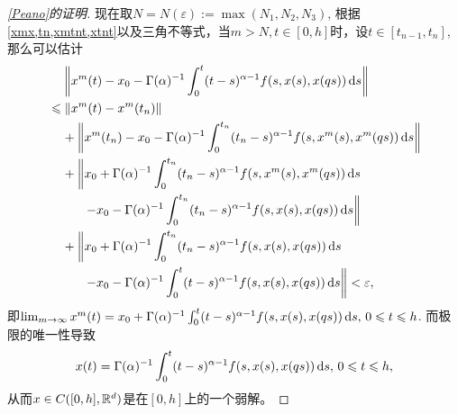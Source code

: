 \begin{proof}[\cref{Peano}的证明]
    现在取$N=N(\varepsilon):=\max (N_1,N_2,N_3)$, 根据\cref{xmx,tn,xmtnt,xtnt}以及三角不等式，当$m>N,t\in [0,h]$时，设$t\in \left[t_{n-1},t_n\right]$, 那么可以估计
    \begin{align*}
        &\relphantom{\leqslant}\left\|x^m(t)-x_0-\Gamma(\alpha)^{-1}\int_{0}^{t}(t-s)^{\alpha-1}f(s,x(s),x(qs))\differential s\right\|
        \\ &\leqslant \left\|x^m(t)-x^m(t_n)\right\|
        \\ &\relphantom{\leqslant}+\left\|x^m(t_n)-x_0-\Gamma(\alpha)^{-1}\int_{0}^{t_n}(t_n-s)^{\alpha-1}f(s,x^m(s),x^m(qs))\differential s\right\|
        \\ &\relphantom{\leqslant}+\left\|x_0+\Gamma(\alpha)^{-1}\int_{0}^{t_n}(t_n-s)^{\alpha-1}f(s,x^m(s),x^m(qs))\differential s\right.
        \\ &\relphantom{\leqslant+} \phantom{\left\|\right.} \left.-x_0-\Gamma(\alpha)^{-1}\int_{0}^{t_n}(t_n-s)^{\alpha-1}f(s,x(s),x(qs))\differential s\right\|
        \\ &\relphantom{\leqslant}+\left\|x_0+\Gamma(\alpha)^{-1}\int_{0}^{t_n}(t_n-s)^{\alpha-1}f(s,x(s),x(qs))\differential s\right.
        \\ &\relphantom{\leqslant+} \phantom{\left\|\right.} \left.-x_0-\Gamma(\alpha)^{-1}\int_{0}^{t}(t-s)^{\alpha-1}f(s,x(s),x(qs))\differential s\right\|
        <\varepsilon,
    \end{align*}
    即$\lim_{m\to \infty}x^m(t)=x_0+\Gamma(\alpha)^{-1}\int_{0}^{t}(t-s)^{\alpha-1}f(s,x(s),x(qs))\mathop{}\!\mathrm{d} s,\,\allowbreak 0\leqslant t\leqslant h$. 而极限的唯一性导致
    \begin{equation*}
        x(t)=\Gamma(\alpha)^{-1}\int_{0}^{t}(t-s)^{\alpha-1}f(s,x(s),x(qs))\mathop{}\!\mathrm{d} s,\,0\leqslant t\leqslant h,
    \end{equation*}
    从而$x\in C([0,h],\mathbb{R}^d)$是\mainEquation 在$[0,h]$上的一个弱解。
\end{proof}

